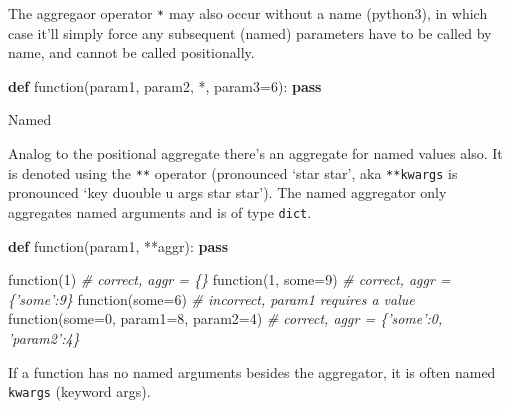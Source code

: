 \documentclass[ignorenonframetext,]{beamer}
\newenvironment{Shaded}{}{}
\newcommand{\KeywordTok}[1]{\textcolor[rgb]{0.00,0.44,0.13}{\textbf{{#1}}}}
\newcommand{\DecValTok}[1]{\textcolor[rgb]{0.25,0.63,0.44}{{#1}}}
\newcommand{\CommentTok}[1]{\textcolor[rgb]{0.38,0.63,0.69}{\textit{{#1}}}}
\newcommand{\ControlFlowTok}[1]{\textcolor[rgb]{0.00,0.44,0.13}{\textbf{{#1}}}}
\newcommand{\OperatorTok}[1]{\textcolor[rgb]{0.40,0.40,0.40}{{#1}}}
\newcommand{\NormalTok}[1]{{#1}}
\begin{document}
\begin{frame}[fragile]

The aggregaor operator \texttt{*} may also occur without a name
(python3), in which case it'll simply force any subsequent (named)
parameters have to be called by name, and cannot be called positionally.

\begin{Shaded}
\begin{Highlighting}[]
\KeywordTok{def} \NormalTok{function(param1, param2, }\OperatorTok{*}\NormalTok{, param3}\OperatorTok{=}\DecValTok{6}\NormalTok{):}
    \ControlFlowTok{pass}
\end{Highlighting}
\end{Shaded}

\end{frame}

\begin{frame}[fragile]

\begin{block}{Named}

Analog to the positional aggregate there's an aggregate for named values
also. It is denoted using the \texttt{**} operator (pronounced `star
star', aka \texttt{**kwargs} is pronounced `key duouble u args star
star'). The named aggregator only aggregates named arguments and is of
type \texttt{dict}.

\begin{Shaded}
\begin{Highlighting}[]
\KeywordTok{def} \NormalTok{function(param1, }\OperatorTok{**}\NormalTok{aggr):}
    \ControlFlowTok{pass}

\NormalTok{function(}\DecValTok{1}\NormalTok{)  }\CommentTok{# correct, aggr = \{\}}
\NormalTok{function(}\DecValTok{1}\NormalTok{, some}\OperatorTok{=}\DecValTok{9}\NormalTok{)  }\CommentTok{# correct, aggr = \{'some':9\}}
\NormalTok{function(some}\OperatorTok{=}\DecValTok{6}\NormalTok{)  }\CommentTok{# incorrect, param1 requires a value}
\NormalTok{function(some}\OperatorTok{=}\DecValTok{0}\NormalTok{, param1}\OperatorTok{=}\DecValTok{8}\NormalTok{, param2}\OperatorTok{=}\DecValTok{4}\NormalTok{)  }
\CommentTok{# correct, aggr = \{'some':0, 'param2':4\}}
\end{Highlighting}
\end{Shaded}

If a function has no named arguments besides the aggregator, it is often
named \texttt{kwargs} (keyword args).

\end{block}

\end{frame}
\end{document}

